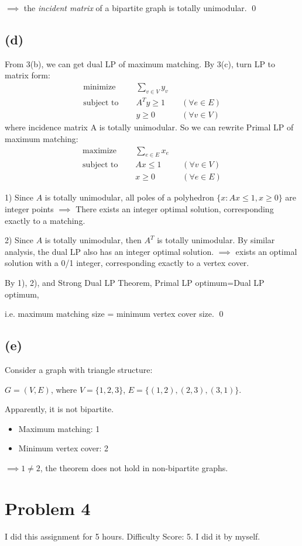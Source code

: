 \documentclass[11pt]{article}
\begin{document}
$\implies$ the \textit{incident matrix} of a bipartite graph is totally unimodular. \qed

\subsection*{(d)}
From 3(b), we can get dual LP of maximum matching. By 3(c), turn LP to matrix form: 
\begin{align*}
    \text{minimize } \quad 
    & \sum_{v \in V} y_v 
    &&  \\
    \text{subject to } \quad
    & A^Ty \ge 1
    && (\forall e \in E)\\
    & y \ge 0 
    && (\forall v \in V)
\end{align*}
where incidence matrix A is totally unimodular.
So we can rewrite Primal LP of maximum matching: 
\begin{align*}
    \text{maximize } \quad 
    & \sum_{e \in E} x_e 
    &&  \\
    \text{subject to } \quad
    & Ax \le 1
    && (\forall v \in V)\\
    & x \ge 0 
    && (\forall e \in E)
\end{align*}

1) Since $A$ is totally unimodular, all poles of a polyhedron $\{x: Ax \le 1, x \ge 0\}$ are integer points $\implies$ 
There exists an integer optimal solution, corresponding exactly to a matching.

2) Since $A$ is totally unimodular, then $A^T$ is totally unimodular. By similar analysis, the dual LP also has an integer optimal solution.
$\implies$ exists an optimal solution with a 0/1 integer, corresponding exactly to a vertex cover. 

By 1), 2), and Strong Dual LP Theorem, Primal LP optimum=Dual LP optimum, 

i.e. maximum matching size = minimum vertex cover size. \qed

\subsection*{(e)}
Consider a graph with triangle structure: 

$G = (V, E)$, where $V = \{1, 2, 3\}$, $E = \{(1,2), (2, 3),(3, 1)\}$. 

Apparently, it is not bipartite. 
\begin{itemize}
    \item Maximum matching: 1
    \item Minimum vertex cover: 2
\end{itemize}
$\implies 1 \ne 2$, the theorem does not hold in non-bipartite graphs.

\section*{Problem 4}
I did this assignment for 5 hours. Difficulty Score: 5. I did it by myself. 
\end{document}
